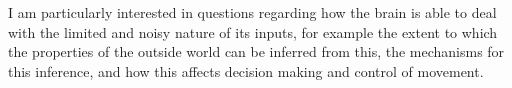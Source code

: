 \documentclass[10pt,oneside]{article}
\begin{document}
I am particularly interested in questions regarding how the brain is able to deal with the limited and noisy nature of its inputs, for example the extent to which the properties of the outside world can be inferred from this, the mechanisms for this inference, and how this affects decision making and control of movement.















\end{document}
